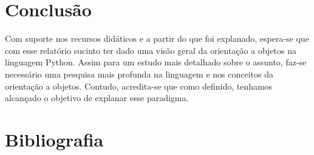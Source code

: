 \documentclass[11pt,a4paper]{article}
\begin{document}
\vspace{0.5in}
%   
\section{Conclusão}

Com suporte nos recursos didáticos e a partir do que foi explanado, espera-se que com esse relatório sucinto ter dado uma visão geral da orientação a objetos na linguagem Python.  Assim para um estudo mais detalhado sobre o assunto, faz-se necessário uma pesquisa mais profunda na linguagem e nos conceitos da orientação a objetos. Contudo, acredita-se que como definido, tenhamos alcançado o objetivo de explanar esse paradigma.
% 

\section{Bibliografia}
\printbibliography
% 
% 
% 
% 
\end{document}
